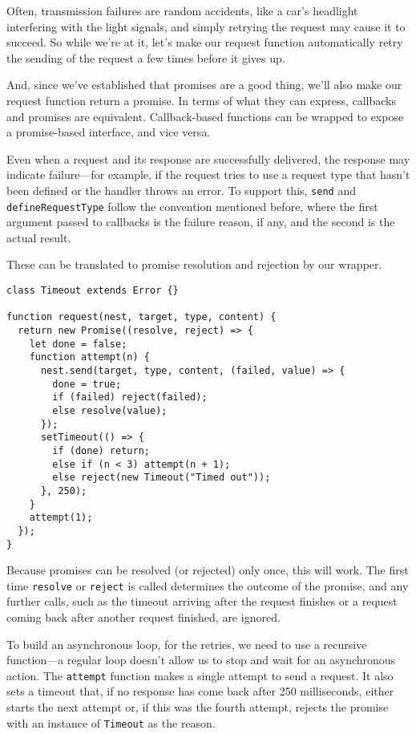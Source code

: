 Often, transmission failures are random accidents, like a car's headlight interfering with the light signals, and simply retrying the request may cause it to succeed. So while we're at it, let's make our request function automatically retry the sending of the request a few times before it gives up.

And, since we've established that promises are a good thing, we'll also make our request function return a promise. In terms of what they can express, callbacks and promises are equivalent. Callback-based functions can be wrapped to expose a promise-based interface, and vice versa.

Even when a request and its response are successfully delivered, the response may indicate failure—for example, if the request tries to use a request type that hasn't been defined or the handler throws an error. To support this, \lstinline`send` and \lstinline`defineRequestType` follow the convention mentioned before, where the first argument passed to callbacks is the failure reason, if any, and the second is the actual result.

These can be translated to promise resolution and rejection by our wrapper.

\begin{lstlisting}
class Timeout extends Error {}

function request(nest, target, type, content) {
  return new Promise((resolve, reject) => {
    let done = false;
    function attempt(n) {
      nest.send(target, type, content, (failed, value) => {
        done = true;
        if (failed) reject(failed);
        else resolve(value);
      });
      setTimeout(() => {
        if (done) return;
        else if (n < 3) attempt(n + 1);
        else reject(new Timeout("Timed out"));
      }, 250);
    }
    attempt(1);
  });
}
\end{lstlisting}
\noindent{}

Because promises can be resolved (or rejected) only once, this will work. The first time \lstinline`resolve` or \lstinline`reject` is called determines the outcome of the promise, and any further calls, such as the timeout arriving after the request finishes or a request coming back after another request finished, are ignored.

To build an asynchronous loop, for the retries, we need to use a recursive function—a regular loop doesn't allow us to stop and wait for an asynchronous action. The \lstinline`attempt` function makes a single attempt to send a request. It also sets a timeout that, if no response has come back after 250 milliseconds, either starts the next attempt or, if this was the fourth attempt, rejects the promise with an instance of \lstinline`Timeout` as the reason.

